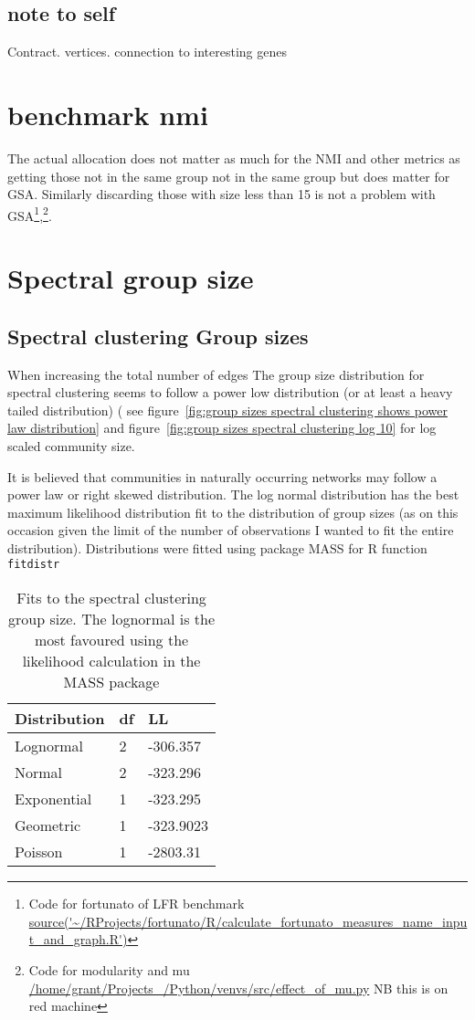 \subsection{note to self}
Contract. vertices. connection to interesting genes
\section{benchmark nmi}

  The actual allocation does not matter as much for the NMI and other metrics as getting those not in the same group not in the same group but does matter for GSA. Similarly discarding those with size less than 15 is not a problem with GSA\footnote{Code for fortunato of LFR benchmark \url{source('~/RProjects/fortunato/R/calculate_fortunato_measures_name_input_and_graph.R')}},\footnote{Code for modularity and mu \url{/home/grant/Projects_/Python/venvs/src/effect_of_mu.py} NB this is on red machine}.


\section{Spectral group size}
\subsection{Spectral clustering Group sizes}


\label{sec:community detection thresholds}


When increasing the total number of edges
The group size distribution for spectral clustering seems to follow a power low distribution (or at least a heavy tailed distribution) ( see figure~\ref{fig:group sizes spectral clustering shows power law distribution} and figure~\ref{fig:group sizes spectral clustering log 10} for log scaled community size. 

It is believed that communities in naturally occurring networks may follow a power law or right skewed distribution.
The log normal distribution has the best maximum likelihood distribution fit to the distribution of group sizes (as on this occasion given the limit of the number of observations I wanted to fit the entire distribution). Distributions were fitted using package MASS  \cite{venables2002mass} for R function \texttt{fitdistr}

\begin{table}[]
    \centering
    \begin{tabular}{lll}
    \toprule
    Distribution     & df & LL  \\
    \midrule
    Lognormal     & 2 &-306.357\\
    Normal      & 2 & -323.296\\
    Exponential & 1 & -323.295\\
    Geometric & 1 & -323.9023\\
    Poisson & 1 & -2803.31\\
    \bottomrule
    \end{tabular}
    \caption{Fits to the spectral clustering group size. The lognormal is the most favoured using the likelihood calculation in the MASS package}
    \label{tab:LL spectral clustering group sizes}
\end{table}

